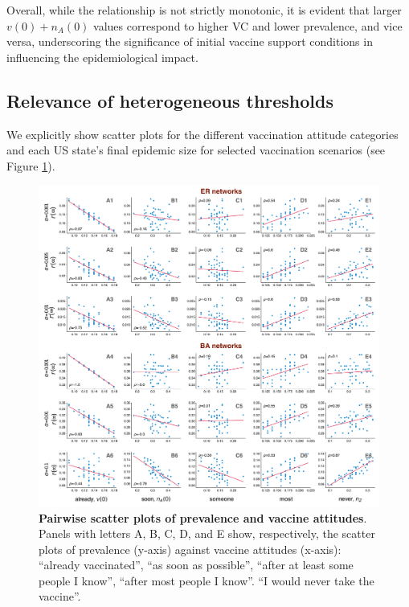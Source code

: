 \documentclass[
 reprint,
 amsmath,amssymb,
 aps,
]{revtex4-2}
\begin{document}
Overall, while the relationship is not strictly monotonic, it is evident that larger $v(0)+n_A(0)$ values correspond to higher VC and lower prevalence, and vice versa, underscoring the significance of initial vaccine support conditions in influencing the epidemiological impact.

\subsection{Relevance of heterogeneous thresholds}
\label{subapp:heterogeneous_erba_relevance}

We explicitly show scatter plots for the different vaccination attitude categories and each US state's final epidemic size for selected vaccination scenarios (see Figure \ref{fig:supp_erba_scatters}).

\begin{figure}
\centering
\includegraphics[width=\textwidth]{figure12.pdf}
\caption[Pairwise scatter plots of prevalence and vaccine attitudes]{
\label{fig:supp_erba_scatters}
\textbf{Pairwise scatter plots of prevalence and vaccine attitudes}. Panels with letters A, B, C, D, and E show, respectively, the scatter plots of prevalence (y-axis) against vaccine attitudes (x-axis): ``already vaccinated'', ``as soon as possible'', ``after at least some people I know'', ``after most people I know''. ``I would never take the vaccine''.
}
\end{figure}
\end{document}
